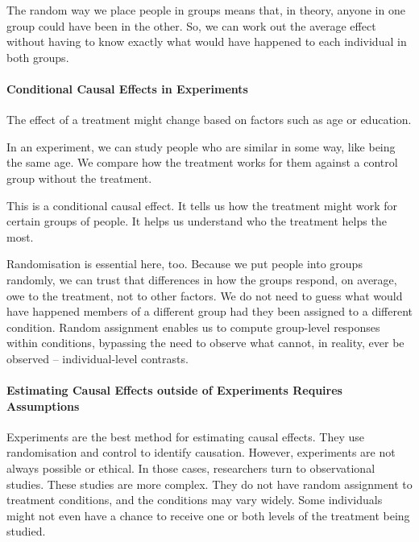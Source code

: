 \documentclass[
  singlecolumn]{article}
\let\oldparagraph\paragraph
\renewcommand{\paragraph}[1]{\oldparagraph{#1}\mbox{}}
\begin{document}
The random way we place people in groups means that, in theory, anyone
in one group could have been in the other. So, we can work out the
average effect without having to know exactly what would have happened
to each individual in both groups.

\paragraph{\texorpdfstring{\textbf{Conditional Causal Effects in
Experiments}}{Conditional Causal Effects in Experiments}}\label{conditional-causal-effects-in-experiments}

The effect of a treatment might change based on factors such as age or
education.

In an experiment, we can study people who are similar in some way, like
being the same age. We compare how the treatment works for them against
a control group without the treatment.

This is a conditional causal effect. It tells us how the treatment might
work for certain groups of people. It helps us understand who the
treatment helps the most.

Randomisation is essential here, too. Because we put people into groups
randomly, we can trust that differences in how the groups respond, on
average, owe to the treatment, not to other factors. We do not need to
guess what would have happened members of a different group had they
been assigned to a different condition. Random assignment enables us to
compute group-level responses within conditions, bypassing the need to
observe what cannot, in reality, ever be observed -- individual-level
contrasts.

\paragraph{\texorpdfstring{\textbf{Estimating Causal Effects outside of
Experiments Requires
Assumptions}}{Estimating Causal Effects outside of Experiments Requires Assumptions}}\label{estimating-causal-effects-outside-of-experiments-requires-assumptions}

Experiments are the best method for estimating causal effects. They use
randomisation and control to identify causation. However, experiments
are not always possible or ethical. In those cases, researchers turn to
observational studies. These studies are more complex. They do not have
random assignment to treatment conditions, and the conditions may vary
widely. Some individuals might not even have a chance to receive one or
both levels of the treatment being studied.
\end{document}
